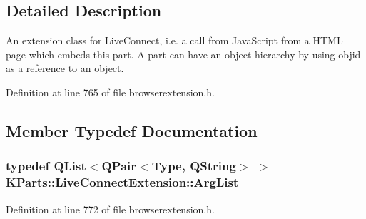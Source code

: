 \subsection{\-Detailed \-Description}
\-An extension class for \-Live\-Connect, i.\-e. a call from \-Java\-Script from a \-H\-T\-M\-L page which embeds this part. \-A part can have an object hierarchy by using objid as a reference to an object. 

\-Definition at line 765 of file browserextension.\-h.



\subsection{\-Member \-Typedef \-Documentation}
\hypertarget{classKParts_1_1LiveConnectExtension_a16a7a582605755e47eaab5b37e73d8cb}{
\subsubsection[{\-Arg\-List}]{\setlength{\rightskip}{0pt plus 5cm}typedef \-Q\-List$<$\-Q\-Pair$<${\bf \-Type}, \-Q\-String$>$ $>$ {\bf \-K\-Parts\-::\-Live\-Connect\-Extension\-::\-Arg\-List}}}\label{classKParts_1_1LiveConnectExtension_a16a7a582605755e47eaab5b37e73d8cb}


\-Definition at line 772 of file browserextension.\-h.



